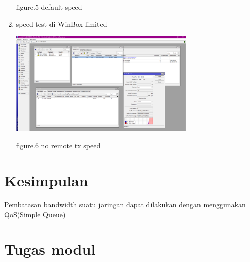 \begin{enumerate}
\begin{center}
        figure.5 default speed
    \end{center}
    \item speed test di WinBox limited
    \begin{center}
        \includegraphics[width=0.7\textwidth]{image/P3/winbox/no_tx.png}

        figure.6 no remote tx speed
    \end{center}
\end{enumerate}

\section{Kesimpulan}

Pembatasan bandwidth suatu jaringan dapat dilakukan dengan menggunakan QoS(Simple Queue)

\section{Tugas modul}

